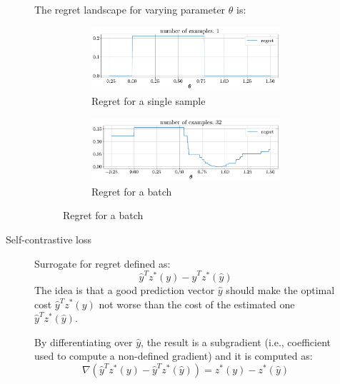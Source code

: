 \begin{description}
\begin{description}
\begin{example}
                    The regret landscape for varying parameter $\theta$ is:
                    \begin{figure}[H]
                        \centering
                        \begin{subfigure}{0.49\linewidth}
                            \centering
                            \includegraphics[width=\linewidth]{./img/_dfl_regret_example2.pdf}
                            \caption{Regret for a single sample}
                        \end{subfigure}
                        \begin{subfigure}{0.49\linewidth}
                            \centering
                            \includegraphics[width=\linewidth]{./img/_dfl_regret_example3.pdf}
                            \caption{Regret for a batch}
                        \end{subfigure}
                    \end{figure}
                \end{example}

            \item[Self-contrastive loss] 
                Surrogate for regret defined as:
                \[ \hat{y}^T z^*(y) - \hat{y}^T z^*(\hat{y}) \] 
                The idea is that a good prediction vector $\hat{y}$ should make the optimal cost $\hat{y}^T z^*(y)$ not worse than the cost of the estimated one $\hat{y}^T z^*(\hat{y})$.

                \begin{remark}
                    By differentiating over $\hat{y}$, the result is a subgradient (i.e., coefficient used to compute a non-defined gradient) and it is computed as:
                    \[ \nabla(\hat{y}^T z^*(y) - \hat{y}^T z^*(\hat{y})) = z^*(y) - z^*(\hat{y}) \]
                \end{remark}


\end{description}
\end{description}
